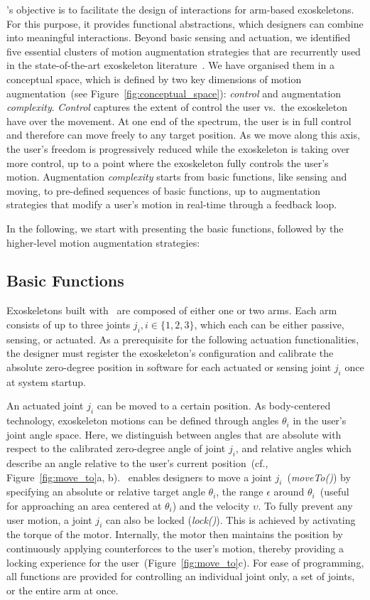 \toolkit's objective is to facilitate the design of interactions for arm-based exoskeletons. For this purpose, it provides functional abstractions, which designers can combine into meaningful interactions. 
Beyond basic sensing and actuation, we identified five essential clusters of motion augmentation strategies that are recurrently used in the state-of-the-art exoskeleton literature~\cite{gasperina_2021,proietti_2016,gull_2020,fernandez_2023,basteris_2014}. We have organised them in a conceptual space, which is defined by two key dimensions of motion augmentation~(see Figure~\ref{fig:conceptual_space}): \textit{control} and augmentation \textit{complexity}. 
\textit{Control} captures the extent of control the user vs.~the exoskeleton have over the movement. At one end of the spectrum, the user is in full control and therefore can move freely to any target position. As we move along this axis, the user's freedom is progressively reduced while the exoskeleton is taking over more control, up to a point where the exoskeleton fully controls the user's motion.
Augmentation \textit{complexity} starts from basic functions, like sensing and moving, to pre-defined sequences of basic functions, up to augmentation strategies that modify a user's motion in real-time through a feedback loop.

In the following, we start with presenting the basic functions, followed by the higher-level motion augmentation strategies: 

\subsection{Basic Functions}
Exoskeletons built with \toolkit~are composed of either one or two arms. Each arm consists of up to three joints $j_i, i \in \{1,2,3\}$, which each can be either passive, sensing, or actuated. 
As a prerequisite for the following actuation functionalities, the designer must register the exoskeleton's configuration and calibrate the absolute zero-degree position in software for each actuated or sensing joint $j_i$ once at system startup.


An actuated joint $j_i$ can be moved to a certain position. As body-centered technology, exoskeleton motions can be defined through angles $\theta_i$ in the user's joint angle space. 
Here, we distinguish between angles that are absolute with respect to the calibrated zero-degree angle of joint $j_i$, and relative angles which describe an angle relative to the user's current position~(cf., Figure~\ref{fig:move_to}a, b).
\toolkit~enables designers to move a joint $j_i$~(\textit{moveTo()}) by specifying an absolute or relative target angle $\theta_i$, the range $\epsilon$ around $\theta_i$~(useful for approaching an area centered at $\theta_i$) and the velocity $\upsilon$. 
To fully prevent any user motion, a joint $j_i$ can also be locked (\textit{lock()}). This is achieved by activating the torque of the motor. Internally, the motor then maintains the position by continuously applying counterforces to the user's motion, thereby providing a locking experience for the user~(Figure~\ref{fig:move_to}c). 
For ease of programming, all functions are provided for controlling an individual joint only, a set of joints, or the entire arm at once. 

